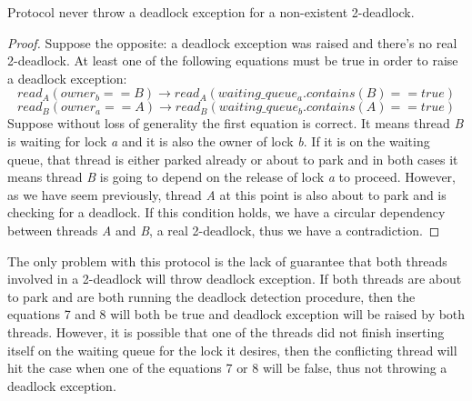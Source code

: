 \begin{lemma}
Protocol never throw a deadlock exception for a non-existent 2-deadlock.
\end{lemma}
\begin{proof}
Suppose the opposite: a deadlock exception was raised and there's no real 2-deadlock. At least one of the following equations must be true in order to raise a deadlock exception:
\begin{equation}
read_{A}(owner_{b} == B) \rightarrow read_{A}(waiting\_queue_{a}.contains(B) == true)
\end{equation}
\begin{equation}
read_{B}(owner_{a} == A) \rightarrow read_{B}(waiting\_queue_{b}.contains(A) == true)
\end{equation}
Suppose without loss of generality the first equation is correct.
It means thread \emph{B} is waiting for lock \emph{a} and it is also the owner of lock \emph{b}.
If it is on the waiting queue, that thread is either parked already or about to park
and in both cases it means thread \emph{B} is going to depend on the release of lock \emph{a} to proceed.
However, as we have seem previously, thread \emph{A} at this point is also about to park and is checking for a deadlock.
If this condition holds, we have a circular dependency between threads \emph{A} and \emph{B}, a real 2-deadlock, thus we have a contradiction.
\end{proof}

The only problem with this protocol is the lack of guarantee that both threads involved in a 2-deadlock will throw deadlock exception. If both threads are about to park and are both running the deadlock detection procedure, then the equations 7 and 8 will both be true and deadlock exception will be raised by both threads. However, it is possible that one of the threads did not finish inserting itself on the waiting queue for the lock it desires, then the conflicting thread will hit the case when one of the equations 7 or 8 will be false, thus not throwing a deadlock exception.

